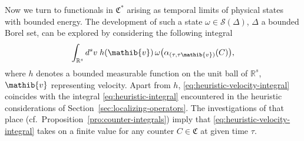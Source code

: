\documentclass[a4paper,a4paper]{article}
\numberwithin{equation}{section}
\newcommand{\Cfrak}{\mathfrak{C}}
\newcommand{\vib}{\mathib{v}}
\newcommand{\Sscr}{\mathscr{S}}
\newcommand{\Rs}{\mathbb{R}^s}
\newcommand{\Cstar}{\mathfrak{C}^*}
\theoremstyle{definition}
\theoremstyle{plain}
\theoremstyle{remark}
\begin{document}
  Now we turn to functionals in $\Cstar$ arising as temporal limits of
  physical states with bounded energy. The development of such a state
  $\omega \in \Sscr ( \Delta )$, $\Delta$ a bounded Borel set, can be
  explored by considering the following integral
  \begin{equation}
    \label{eq:heuristic-velocity-integral}
    \int_{\Rs} d^s v \; h ( \vib ) \, \omega \bigl( \alpha_{( \tau ,
      \tau \vib )} ( C ) \bigr) \text{,}
  \end{equation}
  where $h$ denotes a bounded measurable function on the unit ball of
  $\Rs$, $\vib$ representing velocity. Apart from $h$,
  \eqref{eq:heuristic-velocity-integral} coincides with the integral
  \eqref{eq:heuristic-integral} encountered in the heuristic
  considerations of Section~\ref{sec:localizing-operators}. The
  investigations of that place
  (cf.~Proposition~\ref{pro:counter-integrals}) imply that
  \eqref{eq:heuristic-velocity-integral} takes on a finite value for
  any counter $C \in \Cfrak$ at given time $\tau$.
  
\end{document}
